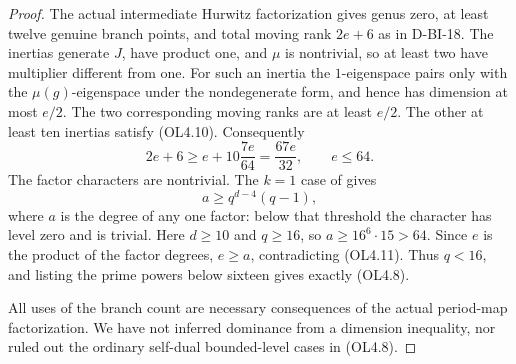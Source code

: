 \begin{proof}
The actual intermediate Hurwitz factorization gives genus zero,
at least twelve genuine branch points, and total moving rank
$2e+6$ as in D-BI-18.  The inertias generate $J$, have product one,
and $\mu$ is nontrivial, so at least two have multiplier different
from one.  For such an inertia the $1$-eigenspace pairs only with
the $\mu(g)$-eigenspace under the nondegenerate form, and hence
has dimension at most $e/2$.  The two corresponding moving ranks
are at least $e/2$.  The other at least ten inertias satisfy (OL4.10).
Consequently
\[
  2e+6\ge e+10\frac{7e}{64}=\frac{67e}{32},\qquad e\le64.
                                                               \tag{OL4.11}
\]
The factor characters are nontrivial.  The $k=1$ case of
\cite[Theorem~3.7, pp.~165--167]{OL:GLT2024} gives
\[
                         a\ge q^{d-4}(q-1),                  \tag{OL4.12}
\]
where $a$ is the degree of any one factor: below that threshold
the character has level zero and is trivial.  Here $d\ge10$ and
$q\ge16$, so $a\ge16^6\cdot15>64$.  Since $e$ is the product of
the factor degrees, $e\ge a$, contradicting (OL4.11).
Thus $q<16$, and listing the prime powers below sixteen gives
exactly (OL4.8).

All uses of the branch count are necessary consequences of the
actual period-map factorization.  We have not inferred dominance
from a dimension inequality, nor ruled out the ordinary self-dual
bounded-level cases in (OL4.8).
\end{proof}
